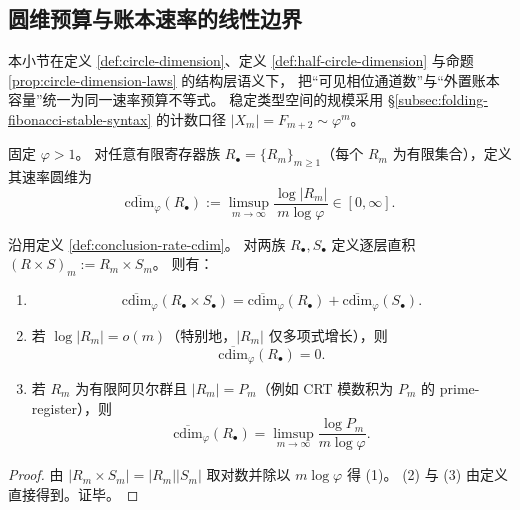 \subsection{圆维预算与账本速率的线性边界}\label{subsec:conclusion-circle-dimension-rate-budget}
本小节在定义 \ref{def:circle-dimension}、定义 \ref{def:half-circle-dimension} 与命题 \ref{prop:circle-dimension-laws} 的结构层语义下，
把“可见相位通道数”与“外置账本容量”统一为同一速率预算不等式。
稳定类型空间的规模采用 \S\ref{subsec:folding-fibonacci-stable-syntax} 的计数口径
\(
|X_m|=F_{m+2}\sim \varphi^m
\)。

\begin{definition}\label{def:conclusion-rate-cdim}
固定 \(\varphi>1\)。
对任意有限寄存器族 \(R_\bullet=\{R_m\}_{m\ge 1}\)（每个 \(R_m\) 为有限集合），定义其速率圆维为
\[
\overline{\mathrm{cdim}}_{\varphi}(R_\bullet)
:=\limsup_{m\to\infty}\frac{\log|R_m|}{m\log\varphi}\in[0,\infty].
\]
\end{definition}

\begin{proposition}[速率圆维的乘积可加性与亚指数消失]\label{prop:conclusion-rate-cdim-arithmetic}
沿用定义 \ref{def:conclusion-rate-cdim}。
对两族 \(R_\bullet,S_\bullet\) 定义逐层直积
\(
(R\times S)_m:=R_m\times S_m
\)。
则有：
\begin{enumerate}
  \item \[
  \overline{\mathrm{cdim}}_{\varphi}(R_\bullet\times S_\bullet)
  =
  \overline{\mathrm{cdim}}_{\varphi}(R_\bullet)
  +
  \overline{\mathrm{cdim}}_{\varphi}(S_\bullet).
  \]
  \item 若 \(\log|R_m|=o(m)\)（特别地，\(|R_m|\) 仅多项式增长），则
  \[
  \overline{\mathrm{cdim}}_{\varphi}(R_\bullet)=0.
  \]
  \item 若 \(R_m\) 为有限阿贝尔群且 \(|R_m|=P_m\)（例如 CRT 模数积为 \(P_m\) 的 prime-register），则
  \[
  \overline{\mathrm{cdim}}_{\varphi}(R_\bullet)
  =\limsup_{m\to\infty}\frac{\log P_m}{m\log\varphi}.
  \]
\end{enumerate}
\end{proposition}
\begin{proof}
由 \(|R_m\times S_m|=|R_m||S_m|\) 取对数并除以 \(m\log\varphi\) 得 (1)。
(2) 与 (3) 由定义直接得到。证毕。
\end{proof}

